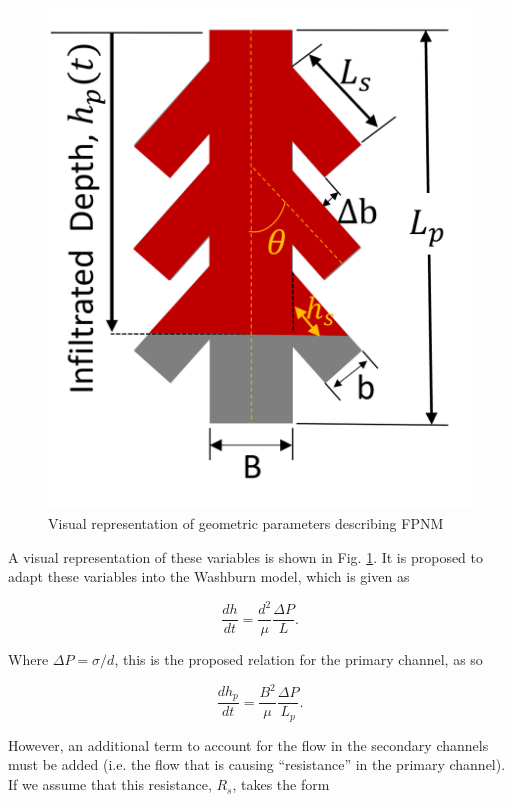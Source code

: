 \documentclass[%
 aip,
 amsmath,amssymb,
 reprint,%
floatfix]{revtex4-1}
\begin{document}
\begin{figure}
    \centering
    \includegraphics[width=\linewidth]{Figures/FPNM_cartoon.png}
    \caption{Visual representation of geometric parameters describing FPNM}
    \label{fig:FPNM_cartoon}
\end{figure}

\noindent A visual representation of these variables is shown in Fig. \ref{fig:FPNM_cartoon}. It is proposed to adapt these variables into the Washburn model\cite{Washburn19213}, which is given as

\begin{equation}
    \frac{dh}{dt} = \frac{d^{2}}{\mu}\frac{\Delta P}{L}.
\end{equation}

\noindent Where $\Delta P = \sigma/d$, this is the proposed relation for the primary channel, as so

\begin{equation}
    \frac{dh_{p}}{dt} = \frac{B^{2}}{\mu}\frac{\Delta P}{L_{p}}.
\end{equation}

\noindent However, an additional term to account for the flow in the secondary channels must be added (i.e. the flow that is causing ``resistance'' in the primary channel). If we assume that this resistance, $R_{s}$, takes the form
\end{document}
